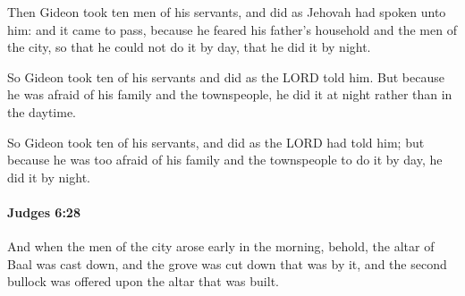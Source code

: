 			\begin{versebox}
					\item[BHS] 
					\item[ASV] Then Gideon took ten men of his servants, and did as Jehovah had spoken unto him: and it came to pass, because he feared his father's household and the men of the city, so that he could not do it by day, that he did it by night.
					\item[NIV] So Gideon took ten of his servants and did as the LORD told him. But because he was afraid of his family and the townspeople, he did it at night rather than in the daytime.
					\item[NRSV] So Gideon took ten of his servants, and did as the LORD had told him; but because he was too afraid of his family and the townspeople to do it by day, he did it by night.
			\end{versebox}

		\paragraph{Judges 6:28} %
			\label{JUDGES-6-28}

			And when the men of the city arose early in the morning, behold, the altar of Baal was cast down, and the grove was cut down that was by it, and the second bullock was offered upon the altar that was built.

